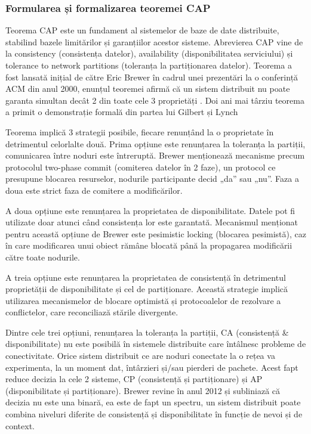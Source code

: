 \subsubsection{Formularea și formalizarea teoremei CAP}

Teorema CAP este un fundament al sistemelor de baze de date distribuite, stabilind bazele limitărilor și garanțiilor acestor sisteme. Abrevierea CAP vine de la consistency (consistența datelor), availability (disponibilitatea serviciului) și tolerance to network partitions (toleranța la partiționarea datelor). Teorema a fost lansată inițial de către Eric Brewer în cadrul unei prezentări la o conferință ACM din anul 2000, enunțul teoremei afirmă că un sistem distribuit nu poate garanta simultan decât 2 din toate cele 3 proprietăți \cite{brewer2000}. Doi ani mai târziu teorema a primit o demonstrație formală din partea lui Gilbert și Lynch \cite{GilbertLynch2002}

Teorema implică 3 strategii posibile, fiecare renunțând la o proprietate în detrimentul celorlalte două. Prima opțiune este renunțarea la toleranța la partiții, comunicarea între noduri este întreruptă. Brewer \cite{brewer2000} menționează mecanisme precum protocolul two-phase commit (comiterea datelor în 2 faze), un protocol ce presupune blocarea resurselor, nodurile participante decid „da” sau „nu”. Faza a doua este strict faza de comitere a modificărilor.

A doua opțiune este renunțarea la proprietatea de disponibilitate. Datele pot fi utilizate doar atunci când consistența lor este garantată. Mecanismul menționat pentru această opțiune de Brewer \cite{brewer2000} este pesimistic locking (blocarea pesimistă), caz în care modificarea unui obiect rămâne blocată până la propagarea modificării către toate nodurile.

A treia opțiune este renunțarea la proprietatea de consistență în detrimentul proprietății de disponibilitate și cel de partiționare. Această strategie implică utilizarea mecanismelor de blocare optimistă și protocoalelor de rezolvare a conflictelor, care reconciliază stările divergente.

Dintre cele trei opțiuni, renunțarea la toleranța la partiții, CA (consistență \& disponibilitate) nu este posibilă în sistemele distribuite care întâlnesc probleme de conectivitate. Orice sistem distribuit ce are noduri conectate la o rețea va experimenta, la un moment dat, întârzieri și/sau pierderi de pachete. Acest fapt reduce decizia la cele 2 sisteme, CP (consistență și partiționare) și AP (disponibilitate și partiționare). Brewer \cite{brewer_cap_2012} revine în anul 2012 și subliniază că decizia nu este una binară, ea este de fapt un spectru, un sistem distribuit poate combina niveluri diferite de consistență și disponibilitate în funcție de nevoi și de context.

